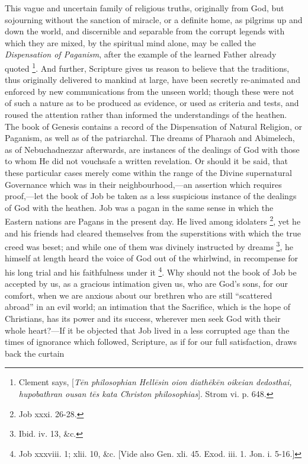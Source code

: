 This vague and uncertain family of religious truths, originally
from God, but sojourning without the sanction of miracle, or a
definite home, as pilgrims up and down the world, and discernible and
separable from the corrupt legends with which they are mixed, by the
spiritual mind alone, may be called the \emph{Dispensation of Paganism},
after the example of the learned Father already quoted \footnote{Clement says, [\emph{T\={e}n philosophian
Hell\={e}sin oion diath\={e}k\={e}n oikeian dedosthai,
hupobathran ousan t\={e}s kata Christon philosophias}]. Strom
vi. p. 648.}. And further, Scripture gives us reason to believe that the
traditions, thus originally delivered to mankind at large, have been
secretly re-animated and enforced by new communications from the
unseen world; though these were not of such a nature as to be produced
as evidence, or used as criteria and tests, and roused the attention
rather than informed the understandings of the heathen. The book of
Genesis contains a record of the Dispensation of Natural Religion, or
Paganism, as well as of the patriarchal. The dreams of Pharaoh and
Abimelech, as of Nebuchadnezzar afterwards, are instances of the
dealings of God with those to whom He did not vouchsafe a written
revelation. Or should it be said, that these particular cases merely
come within the range of the Divine supernatural Governance which was
in their neighbourhood,—an assertion which requires proof,—let the
book of Job be taken as a less suspicious instance of the dealings of
God with the heathen. Job was a pagan in the same sense in which the
Eastern nations are Pagans in the present day. He lived among
idolaters \footnote{Job xxxi. 26-28.}, yet he and
his friends had cleared themselves from the superstitions with which
the true creed was beset; and while one of them was divinely
instructed by dreams \footnote{Ibid. iv. 13, \&c.},
he himself at length heard the voice of God out of the whirlwind, in
recompense for his long trial and his faithfulness under it \footnote{Job xxxviii. 1; xlii. 10, \&c. [Vide
also Gen. xli. 45. Exod. iii. 1. Jon. i. 5-16.]}. Why should not the book of Job be accepted by us, as a
gracious intimation given us, who are God's sons, for our comfort,
when we are anxious about our brethren who are still ``scattered
abroad'' in an evil world; an intimation that the Sacrifice, which
is the hope of Christians, has its power and its success, wherever men
seek God with their whole heart?—If it be objected that Job lived in
a less corrupted age than the times of ignorance which followed,
Scripture, as if for our full satisfaction, draws back the curtain
